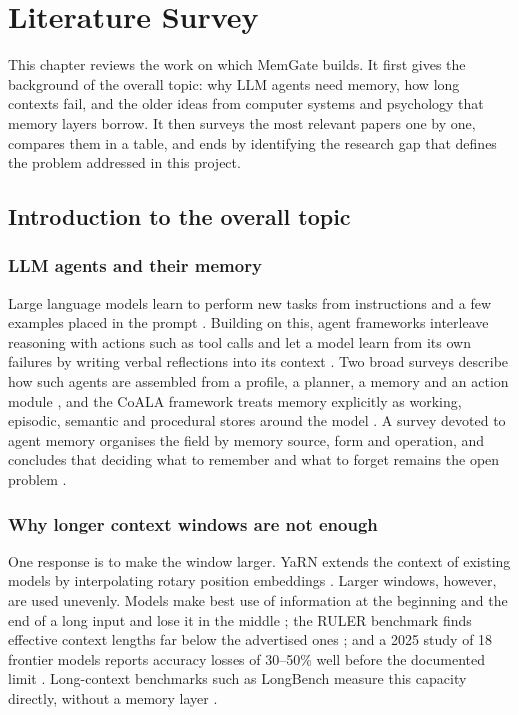 \chapter{Literature Survey}
\label{ch:lit}

This chapter reviews the work on which MemGate builds. It first gives the
background of the overall topic: why LLM agents need memory, how long
contexts fail, and the older ideas from computer systems and psychology that
memory layers borrow. It then surveys the most relevant papers one by one,
compares them in a table, and ends by identifying the research gap that
defines the problem addressed in this project.

\section{Introduction to the overall topic}

\subsection{LLM agents and their memory}
Large language models learn to perform new tasks from instructions and a few
examples placed in the prompt \cite{brown2020gpt3}. Building on this, agent
frameworks interleave reasoning with actions such as tool calls
\cite{yao2023react} and let a model learn from its own failures by writing
verbal reflections into its context \cite{shinn2023reflexion}. Two broad
surveys describe how such agents are assembled from a profile, a planner, a
memory and an action module
\cite{wang2024agentsurvey,xi2023agentsurvey}, and the CoALA framework treats
memory explicitly as working, episodic, semantic and procedural stores around
the model \cite{sumers2024coala}. A survey devoted to agent memory organises
the field by memory source, form and operation, and concludes that deciding
what to remember and what to forget remains the open problem
\cite{zhang2024memorysurvey}.

\subsection{Why longer context windows are not enough}
One response is to make the window larger. YaRN extends the context of
existing models by interpolating rotary position embeddings
\cite{peng2024yarn}. Larger windows, however, are used unevenly. Models make
best use of information at the beginning and the end of a long input and
lose it in the middle \cite{liu2024lostmiddle}; the RULER benchmark finds
effective context lengths far below the advertised ones \cite{hsieh2024ruler};
and a 2025 study of 18 frontier models reports accuracy losses of 30--50\% well
before the documented limit \cite{chroma2025contextrot}. Long-context
benchmarks such as LongBench measure this capacity directly, without a memory
layer \cite{bai2024longbench}.

